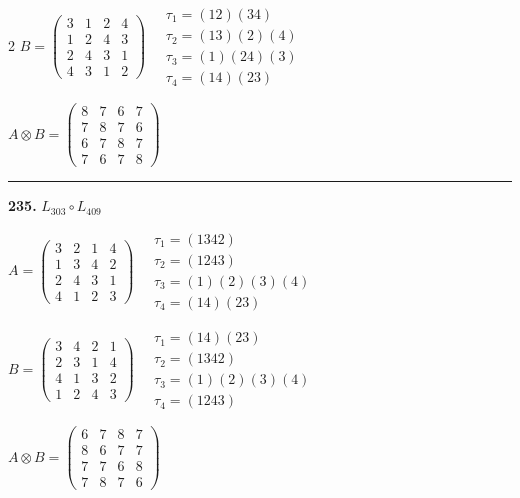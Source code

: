 \begin{multicols}{2}
$B = \begin{pmatrix} 3 & 1 & 2 & 4 \\ 1 & 2 & 4 & 3 \\ 2 & 4 & 3 & 1 \\ 4 & 3 & 1 & 2 \end{pmatrix} \quad \begin{matrix} \tau_{1}=(1 2)(3 4) \\ \tau_{2}=(1 3)(2)(4) \\ \tau_{3}=(1)(2 4)(3) \\ \tau_{4}=(1 4)(2 3) \end{matrix}$

$A \otimes B = \begin{pmatrix} 8 & 7 & 6 & 7 \\ 7 & 8 & 7 & 6 \\ 6 & 7 & 8 & 7 \\ 7 & 6 & 7 & 8 \end{pmatrix}$

\vspace{0.3em}
\hrule
\vspace{0.3em}

\noindent\textbf{235.} $L_{303} \circ L_{409}$

$A = \begin{pmatrix} 3 & 2 & 1 & 4 \\ 1 & 3 & 4 & 2 \\ 2 & 4 & 3 & 1 \\ 4 & 1 & 2 & 3 \end{pmatrix} \quad \begin{matrix} \tau_{1}=(1 3 4 2) \\ \tau_{2}=(1 2 4 3) \\ \tau_{3}=(1)(2)(3)(4) \\ \tau_{4}=(1 4)(2 3) \end{matrix}$

$B = \begin{pmatrix} 3 & 4 & 2 & 1 \\ 2 & 3 & 1 & 4 \\ 4 & 1 & 3 & 2 \\ 1 & 2 & 4 & 3 \end{pmatrix} \quad \begin{matrix} \tau_{1}=(1 4)(2 3) \\ \tau_{2}=(1 3 4 2) \\ \tau_{3}=(1)(2)(3)(4) \\ \tau_{4}=(1 2 4 3) \end{matrix}$

$A \otimes B = \begin{pmatrix} 6 & 7 & 8 & 7 \\ 8 & 6 & 7 & 7 \\ 7 & 7 & 6 & 8 \\ 7 & 8 & 7 & 6 \end{pmatrix}$


\end{multicols}
